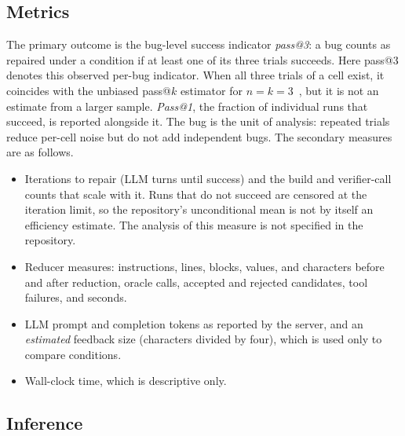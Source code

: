 \documentclass[conference]{IEEEtran}
\begin{document}
\subsection{Metrics}

The primary outcome is the bug-level success indicator \emph{pass@3}: a bug counts as repaired under a condition if at least one of its three trials succeeds. Here pass@3 denotes this observed per-bug indicator. When all three trials of a cell exist, it coincides with the unbiased pass@$k$ estimator for $n=k=3$~\cite{yang2026reducefix}, but it is not an estimate from a larger sample. \emph{Pass@1}, the fraction of individual runs that succeed, is reported alongside it. The bug is the unit of analysis: repeated trials reduce per-cell noise but do not add independent bugs. The secondary measures are as follows.
\begin{itemize}
\item Iterations to repair (LLM turns until success) and the build and verifier-call counts that scale with it. Runs that do not succeed are censored at the iteration limit, so the repository's unconditional mean is not by itself an efficiency estimate. The analysis of this measure is not specified in the repository.
\item Reducer measures: instructions, lines, blocks, values, and characters before and after reduction, oracle calls, accepted and rejected candidates, tool failures, and seconds.
\item LLM prompt and completion tokens as reported by the server, and an \emph{estimated} feedback size (characters divided by four), which is used only to compare conditions.
\item Wall-clock time, which is descriptive only.
\end{itemize}

\subsection{Inference}
\end{document}
